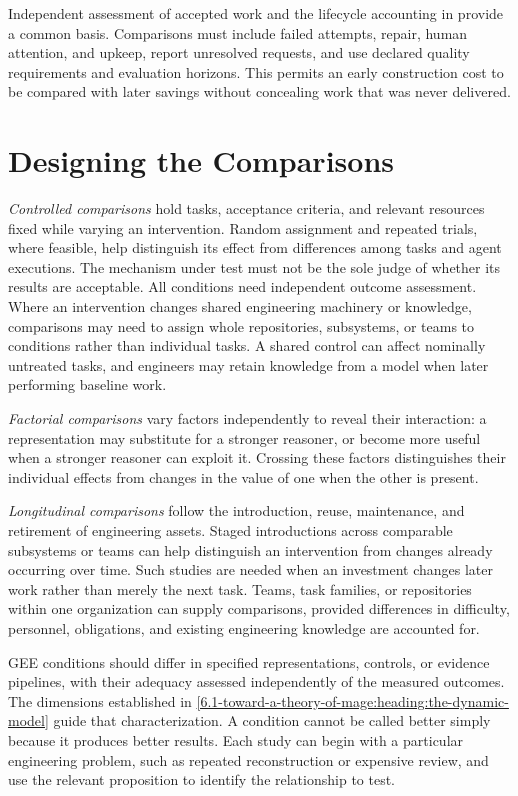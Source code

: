 Independent assessment of accepted work and the lifecycle accounting in  provide a common basis. Comparisons must include failed attempts, repair, human attention, and upkeep, report unresolved requests, and use declared quality requirements and evaluation horizons. This permits an early construction cost to be compared with later savings without concealing work that was never delivered.

\section{Designing the Comparisons}\label{heading:research-designing-the-comparisons}

\emph{Controlled comparisons} hold tasks, acceptance criteria, and relevant resources fixed while varying an intervention. Random assignment and repeated trials, where feasible, help distinguish its effect from differences among tasks and agent executions. The mechanism under test must not be the sole judge of whether its results are acceptable. All conditions need independent outcome assessment. Where an intervention changes shared engineering machinery or knowledge, comparisons may need to assign whole repositories, subsystems, or teams to conditions rather than individual tasks. A shared control can affect nominally untreated tasks, and engineers may retain knowledge from a model when later performing baseline work.

\emph{Factorial comparisons} vary factors independently to reveal their interaction: a representation may substitute for a stronger reasoner, or become more useful when a stronger reasoner can exploit it. Crossing these factors distinguishes their individual effects from changes in the value of one when the other is present.

\emph{Longitudinal comparisons} follow the introduction, reuse, maintenance, and retirement of engineering assets. Staged introductions across comparable subsystems or teams can help distinguish an intervention from changes already occurring over time. Such studies are needed when an investment changes later work rather than merely the next task. Teams, task families, or repositories within one organization can supply comparisons, provided differences in difficulty, personnel, obligations, and existing engineering knowledge are accounted for.

GEE conditions should differ in specified representations, controls, or evidence pipelines, with their adequacy assessed independently of the measured outcomes. The dimensions established in \autoref{6.1-toward-a-theory-of-mage:heading:the-dynamic-model} guide that characterization. A condition cannot be called better simply because it produces better results. Each study can begin with a particular engineering problem, such as repeated reconstruction or expensive review, and use the relevant proposition to identify the relationship to test.

